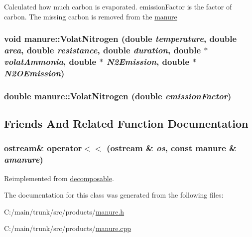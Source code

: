 Calculated how much carbon is evaporated. emissionFactor is the factor of carbon. The missing carbon is removed from the \hyperlink{classmanure}{manure} \hypertarget{classmanure_a28d72550be1b4392ebabfdbbb8c36e39}{
\subsubsection[{VolatNitrogen}]{\setlength{\rightskip}{0pt plus 5cm}void manure::VolatNitrogen (double {\em temperature}, \/  double {\em area}, \/  double {\em resistance}, \/  double {\em duration}, \/  double $\ast$ {\em volatAmmonia}, \/  double $\ast$ {\em N2Emission}, \/  double $\ast$ {\em N2OEmission})}}
\label{classmanure_a28d72550be1b4392ebabfdbbb8c36e39}
\hypertarget{classmanure_ab9836c0cde19119bae96ee2602c75f95}{
\subsubsection[{VolatNitrogen}]{\setlength{\rightskip}{0pt plus 5cm}double manure::VolatNitrogen (double {\em emissionFactor})}}
\label{classmanure_ab9836c0cde19119bae96ee2602c75f95}


\subsection{Friends And Related Function Documentation}
\hypertarget{classmanure_a88bca29dfcbb79bbe0a8a0ea33186fcc}{
\subsubsection[{operator$<$$<$}]{\setlength{\rightskip}{0pt plus 5cm}ostream\& operator$<$$<$ (ostream \& {\em os}, \/  const {\bf manure} \& {\em amanure})}}
\label{classmanure_a88bca29dfcbb79bbe0a8a0ea33186fcc}


Reimplemented from \hyperlink{classdecomposable_a44e65cd8ff15e859dba4d1bfd1003c98}{decomposable}.

The documentation for this class was generated from the following files:\begin{DoxyCompactItemize}
\item 
C:/main/trunk/src/products/\hyperlink{manure_8h}{manure.h}\item 
C:/main/trunk/src/products/\hyperlink{manure_8cpp}{manure.cpp}\end{DoxyCompactItemize}

